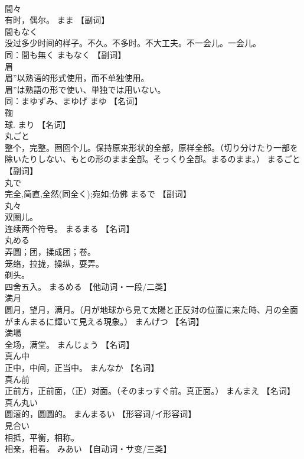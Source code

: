 \documentclass[8pt]{extreport}
\begin{document}
\begin{CJK}{UTF8}{min}
\\	間々	
\\	有时，偶尔。	まま		【副词】
\\	間もなく	
\\	没过多少时间的样子。不久。不多时。不大工夫。不一会儿。一会儿。 
\\	同：間も無く	まもなく		【副词】
\\	眉	
\\	眉”以熟语的形式使用，而不单独使用。 
\\	眉”は熟語の形で使い、単独では用いない。 
\\	同：まゆずみ、まゆげ	まゆ		【名词】
\\	鞠	
\\	球.	まり		【名词】
\\	丸ごと	
\\	整个，完整。囫囵个儿。保持原来形状的全部，原样全部。（切り分けたり一部を除いたりしない、もとの形のまま全部。そっくり全部。まるのまま。）	まるごと		【副词】
\\	丸で	
\\	完全,简直,全然(同全く);宛如;仿佛	まるで		【副词】
\\	丸々	
\\	双圈儿。 
\\	连续两个符号。	まるまる		【名词】
\\	丸める	
\\	弄圆；团，揉成团；卷。 
\\	笼络，拉拢，操纵，耍弄。 
\\	剃头。 
\\	四舍五入。	まるめる		【他动词・一段/二类】
\\	満月	
\\	圆月，望月，满月。（月が地球から見て太陽と正反対の位置に来た時、月の全面がまんまるに輝いて見える現象。）	まんげつ		【名词】
\\	満場	
\\	全场，满堂。	まんじょう		【名词】
\\	真ん中	
\\	正中，中间，正当中。	まんなか		【名词】
\\	真ん前	
\\	正前方，正前面，（正）对面。（そのまっすぐ前。真正面。）	まんまえ		【名词】
\\	真ん丸い	
\\	圆滚的，圆圆的。	まんまるい		【形容词/イ形容词】
\\	見合い	
\\	相抵，平衡，相称。 
\\	相亲，相看。	みあい		【自动词・サ变/三类】

\end{CJK}
\end{document}
